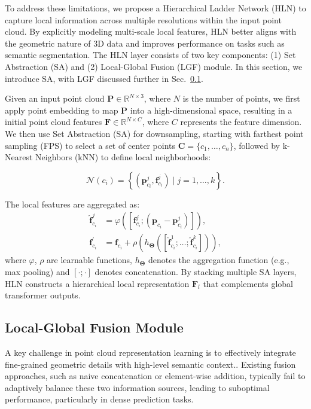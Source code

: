 To address these limitations, we propose a Hierarchical Ladder Network (HLN) to capture local information across multiple resolutions within the input point cloud. By explicitly modeling multi-scale local features, HLN better aligns with the geometric nature of 3D data and improves performance on tasks such as semantic segmentation. The HLN layer consists of two key components: (1) Set Abstraction (SA) and (2) Local-Global Fusion (LGF) module. In this section, we introduce SA, with LGF discussed further in Sec.~\ref{sec:LGF}.

Given an input point cloud $\mathbf{P} \in \mathbb{R}^{N \times 3}$, where $N$ is the number of points, we first apply point embedding to map $\mathbf{P}$ into a high-dimensional space, resulting in a initial point cloud features $\mathbf{F} \in \mathbb{R}^{N \times C}$, where $C$ represents the feature dimension. We then use Set Abstraction (SA) for downsampling, starting with farthest point sampling (FPS) to select a set of center points $\mathbf{C}=\{c_1, \ldots, c_n\}$, followed by k-Nearest Neighbors (kNN) to define local neighborhoods: 

\begin{equation}
    \mathcal{N}(c_i) = \left\{(\mathbf{p}_{c_i}^j, \mathbf{f}_{c_i}^j) \mid j = 1, \dots, k \right\}.
\end{equation}

The local features are aggregated as:
\begin{align}
    \hat{\mathbf{f}}_{c_i}^{j} &= \varphi\left(\left[\mathbf{f}_{c_i}^{j}; (\mathbf{p}_{c_i} - \mathbf{p}_{c_i}^j)\right]\right), \\
    \mathbf{f}_{c_i}^{\prime} &= \mathbf{f}_{c_i} + \rho\left(h_{\boldsymbol{\Theta}}([\hat{\mathbf{f}}_{c_i}^{1}; \dots; \hat{\mathbf{f}}_{c_i}^{k}])\right),
\end{align}
where $\varphi$, $\rho$ are learnable functions, $h_{\boldsymbol{\Theta}}$ denotes the aggregation function (e.g., max pooling) and $[\cdot ; \cdot]$ denotes concatenation. By stacking multiple SA layers, HLN constructs a hierarchical local representation $\mathbf{F}_l$ that complements global transformer outputs.

\subsection{Local-Global Fusion Module}
\label{sec:LGF}

A key challenge in point cloud representation learning is to effectively integrate fine-grained geometric details with high-level semantic context.. Existing fusion approaches, such as naive concatenation or element-wise addition, typically fail to adaptively balance these two information sources, leading to suboptimal performance, particularly in dense prediction tasks.

